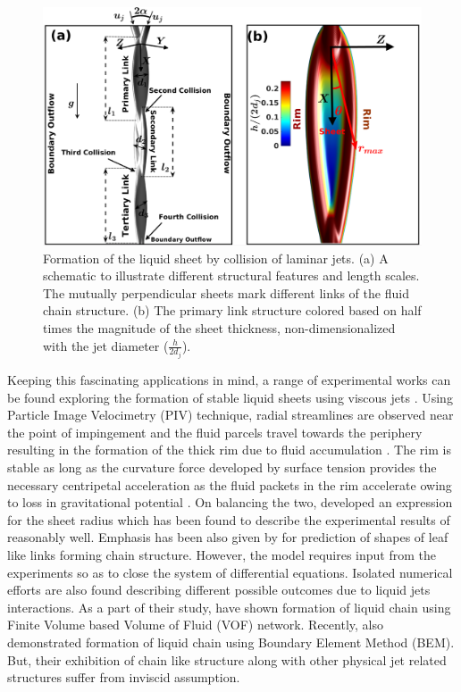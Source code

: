 \documentclass{jfm}
\begin{document}
\begin{figure}
	\centering
	\includegraphics[width=0.6\linewidth]{Figure1}
	\caption{Formation of the liquid sheet by collision of laminar jets. (a) A schematic to illustrate different structural features and length scales. The mutually perpendicular sheets mark different links of the fluid chain structure. (b) The primary link structure colored based on half times the magnitude of the sheet thickness, non-dimensionalized with the jet diameter ($\frac{h}{2d_j}$).}
	\label{Figure::schematic}
\end{figure}
Keeping this fascinating applications in mind, a range of  experimental works can be found exploring the formation of stable liquid sheets using viscous jets \citep{choo2001parametric,choo2002velocity,bush2004collision}. Using Particle Image Velocimetry (PIV) technique, radial streamlines are observed near the point of impingement and the fluid parcels travel towards the periphery resulting in the formation of the thick rim due to fluid accumulation \citep{choo2002velocity,bush2004collision}. The rim is stable as long as the curvature force developed by surface tension provides the necessary centripetal acceleration as the fluid packets in the rim accelerate owing to loss in gravitational potential \citep{bremond2006atomization}. On balancing the two, \cite{taylor1960formation} developed an expression for the sheet radius which has been found to describe the experimental results of \cite{bush2004collision} reasonably well. Emphasis has been also given by \cite{bush2004collision} for prediction of shapes of leaf like links forming chain structure. However, the model requires input from the experiments so as to close the system of differential equations. Isolated numerical efforts are also found describing different possible outcomes due to liquid jets interactions. As a part of their study, \cite{chen2013high} have shown formation of liquid chain using Finite Volume based Volume of Fluid (VOF) network. Recently, \cite{da2016surface} also demonstrated formation of liquid chain using Boundary Element Method (BEM). But, their exhibition of chain like structure along with other physical jet related structures suffer from inviscid assumption.\\
\end{document}

